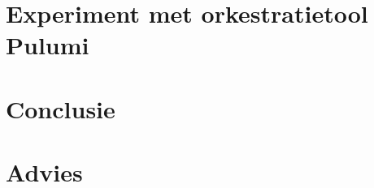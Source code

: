 




\section{Experiment met orkestratietool Pulumi}\label{subsec:ch5-experiment-met-orkestratietool-pulumi}

\section{Conclusie}\label{subsec:ch5-conclusie}


\section{Advies}\label{subsec:ch5-advies}